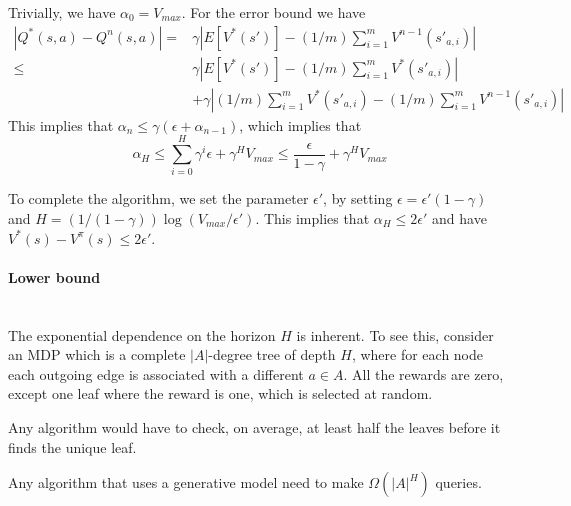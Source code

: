 Trivially, we have $\alpha_0=V_{max}$. For the error bound we have
\begin{align*}
|Q^*(s,a)-Q^n(s,a)|=&\gamma|E[V^*(s')]-(1/m)\sum_{i=1}^m
V^{n-1}(s'_{a,i})|\\
\leq &\gamma|E[V^*(s')]-(1/m)\sum_{i=1}^m V^{*}(s'_{a,i})|\\
&+\gamma|(1/m)\sum_{i=1}^m V^{*}(s'_{a,i})-(1/m)\sum_{i=1}^m
V^{n-1}(s'_{a,i})|
\end{align*}
This implies that $\alpha_n \leq \gamma(\epsilon+\alpha_{n-1})$,
which implies that
\[
\alpha_H\leq \sum_{i=0}^H \gamma^i \epsilon + \gamma^H V_{max}\leq
\frac{\epsilon}{1-\gamma}+\gamma^H V_{max}
\]

To complete the algorithm, we set the parameter $\epsilon'$, by
setting $\epsilon=\epsilon'(1-\gamma)$ and
$H=(1/(1-\gamma))\log(V_{max}/\epsilon')$. This implies that
$\alpha_H\leq 2\epsilon'$ and have $V^*(s)-V^\pi(s)\leq 2\epsilon'$.

\paragraph{Lower bound}\ \\

The exponential dependence on the horizon $H$ is inherent. To see
this, consider an MDP which is a complete $|A|$-degree tree of depth
$H$, where for each node each outgoing edge is associated with a
different $a\in A$. All the rewards are zero, except one leaf where
the reward is one, which is selected at random.

Any algorithm would have to check, on average, at least half the
leaves before it finds the unique leaf.

\begin{theorem}
Any algorithm that uses a generative model need to make
$\Omega(|A|^H)$ queries.
\end{theorem}


